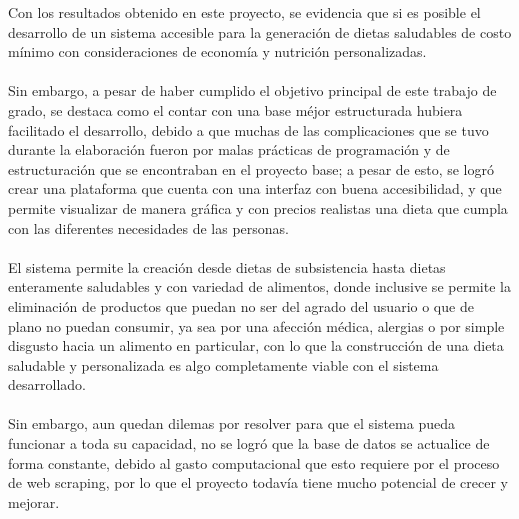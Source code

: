 
\noindent Con los resultados obtenido en este proyecto, se evidencia que si es posible el desarrollo de un sistema accesible para la generaci\'on de dietas saludables de costo m\'inimo con consideraciones de econom\'ia y nutrici\'on personalizadas.
\\
\\
Sin embargo, a pesar de haber cumplido el objetivo principal de este trabajo de grado, se destaca como el contar con una base m\'ejor estructurada hubiera facilitado el desarrollo, debido a que muchas de las complicaciones que se tuvo durante la elaboraci\'on fueron por malas pr\'acticas de programaci\'on y de estructuraci\'on que se encontraban en el proyecto base; a pesar de esto, se logr\'o crear una plataforma que cuenta con una interfaz con buena accesibilidad, y que permite visualizar de manera gr\'afica y con precios realistas una dieta que cumpla con las diferentes necesidades de las personas.
\\
\\
El sistema permite la creaci\'on desde dietas de subsistencia hasta dietas enteramente saludables y con variedad de alimentos, donde inclusive se permite la eliminaci\'on de productos que puedan no ser del agrado del usuario o que de plano no puedan consumir, ya sea por una afecci\'on m\'edica, alergias o por simple disgusto hacia un alimento en particular, con lo que la construcci\'on de una dieta saludable y personalizada es algo completamente viable con el sistema desarrollado.
\\
\\
Sin embargo, aun quedan dilemas por resolver para que el sistema pueda funcionar a toda su capacidad, no se logr\'o que la base de datos se actualice de forma constante, debido al gasto computacional que esto requiere por el proceso de web scraping, por lo que el proyecto todav\'ia tiene mucho potencial de crecer y mejorar.